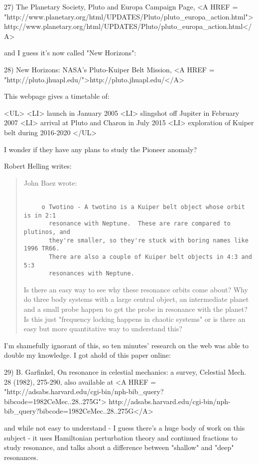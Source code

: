 27) The Planetary Society, Pluto and Europa Campaign Page, 
<A HREF = "http://www.planetary.org/html/UPDATES/Pluto/pluto_europa_action.html">http://www.planetary.org/html/UPDATES/Pluto/pluto_europa_action.html</A>

and I guess it's now called "New Horizons":

28) New Horizons: NASA's Pluto-Kuiper Belt Mission, 
<A HREF = "http://pluto.jhuapl.edu/">http://pluto.jhuapl.edu/</A>

This webpage gives a timetable of:

<UL>
<LI>
 launch in January 2005
<LI>
 slingshot off Jupiter in February 2007
<LI>
 arrival at Pluto and Charon in July 2015
<LI>
 exploration of Kuiper belt during 2016-2020
</UL>

I wonder if they have any plans to study the Pioneer anomaly?

Robert Helling writes:

\begin{quote}
 John Baez wrote:

\begin{verbatim}

     o Twotino - A twotino is a Kuiper belt object whose orbit is in 2:1
       resonance with Neptune.  These are rare compared to plutinos, and
       they're smaller, so they're stuck with boring names like 1996 TR66.
       There are also a couple of Kuiper belt objects in 4:3 and 5:3
       resonances with Neptune.
\end{verbatim}
    
 Is there an easy way to see why these resonance orbits come about? Why
 do three body systems with a large central object, an intermediate
 planet and a small probe happen to get the probe in resonance with the
 planet? Is this just "frequency locking happens in chaotic systems"
 or is there an easy but more quantitative way to understand this?
\end{quote}
I'm shamefully ignorant of this, so ten minutes' research on the
web was able to double my knowledge.  I got ahold of this paper
online:

29) B. Garfinkel, On resonance in celestial mechanics: a survey,
Celestial Mech. 28 (1982), 275-290, also available at
<A HREF = "http://adsabs.harvard.edu/cgi-bin/nph-bib_query?bibcode=1982CeMec..28..275G">
http://adsabs.harvard.edu/cgi-bin/nph-bib_query?bibcode=1982CeMec..28..275G</A>

and while not easy to understand - I guess there's a huge body of 
work on this subject - it uses Hamiltonian perturbation theory
and continued fractions to study resonance, and talks about a difference 
between "shallow" and "deep" resonances.  

